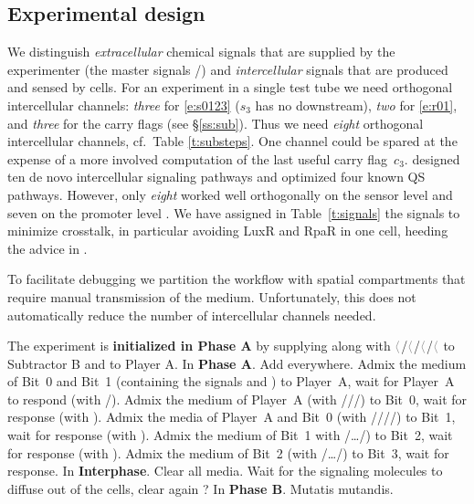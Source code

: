 \documentclass[12pt,notitlepage]{article}
\let\cite\citep
\newcommand{\cbra}[1]{{\ensuremath{\color{gray}{#1}}}}
\newcommand{\signal}[1]{{{\cbra{\langle}\ce{#1}\cbra{\rangle}}}}
\newcommand{\ra}[1]{{\color{Blue}#1}}
\begin{document}












\subsection{Experimental design} \label{ss:experiment}

We distinguish
\emph{extracellular} chemical signals 
that are supplied by the experimenter
(the master signals /)
and
\emph{intercellular} signals
that are produced and sensed by cells.
%
%
%
For an experiment in a single test tube 
we need
orthogonal intercellular channels:
\emph{three} for \eqref{e:s0123}
($s_3$ has no downstream),
\emph{two} for \eqref{e:r01},
and
\emph{three} for the carry flags
(see \S\ref{ss:sub}).
%
Thus we need \emph{eight} orthogonal intercellular channels,
cf.~Table \ref{t:substeps}.
%
One channel could be spared 
at the expense
of a more involved computation of 
the last useful carry flag~$c_3$.
%
\citet{DuETAL2020}
designed
ten de novo intercellular signaling pathways
and
optimized
four known QS pathways.
%
However,
only \emph{eight} worked well orthogonally
on the sensor level 
and 
seven on the promoter level
\cite[\href{https://www.nature.com/articles/s41467-020-17993-w/figures/3}{Fig.~3c/g}]{DuETAL2020}.
%
We have assigned in Table~\ref{t:signals}
the signals
to minimize crosstalk,
in particular 
avoiding LuxR and RpaR in one cell,
heeding the advice in \cite[p.6]{DuETAL2020}.
%
%




%

\ra{
To facilitate debugging
we partition the workflow
with spatial compartments
that require manual transmission of 
the medium.
%
%
Unfortunately, this does not automatically reduce
the number of intercellular channels needed.
}


\ra{
The experiment is
\textbf{initialized in Phase A}
by supplying
along with
\signal{s_3}/\signal{s_2}/\signal{s_1}/\signal{s_0}
to Subtractor B
and
to Player A.
}
%
%
In \textbf{Phase A}.
%
Add  everywhere.
Admix the medium of Bit~0 and Bit~1 
(containing the signals  and )
to Player~A,
wait for Player~A to respond
(with /).
%
Admix the medium of Player~A
(with ///)
to Bit~0, wait for response
(with ).
%
Admix the media of Player~A and Bit~0
(with ////)
to Bit~1, wait for response
(with ).
%
Admix the medium of Bit~1 
with /\ldots/)
to
Bit~2,
wait for response
(with ).
%
Admix the medium of Bit~2
(with /\ldots/)
to Bit~3,
wait for response.
%
%
In \textbf{Interphase}.
%
Clear all media.
%
\ra{Wait for the signaling molecules to diffuse
out of the cells, clear again ?}
%
In \textbf{Phase B}.
%
Mutatis mutandis.
\end{document}
